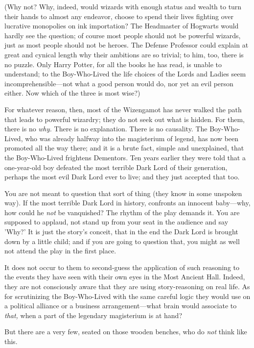 (Why not? Why, indeed, would wizards with enough status and wealth to turn 
their hands to almost any endeavor, choose to spend their lives fighting over 
lucrative monopolies on ink importation? The Headmaster of Hogwarts would 
hardly see the question; of course most people should not be powerful wizards, 
just as most people should not be heroes. The Defense Professor could explain 
at great and cynical length why their ambitions are so trivial; to him, too, 
there is no puzzle. Only Harry Potter, for all the books he has read, is unable 
to understand; to the Boy-Who-Lived the life choices of the Lords and Ladies 
seem incomprehensible---not what a good person would do, nor yet an evil person 
either. Now which of the three is most wise?)

For whatever reason, then, most of the Wizengamot has never walked the path 
that leads to powerful wizardry; they do not seek out what is hidden. For them, 
there is no \emph{why.} There is no explanation. There is no causality. The 
Boy-Who-Lived, who was already halfway into the magisterium of legend, has now 
been promoted all the way there; and it is a brute fact, simple and 
unexplained, that the Boy-Who-Lived frightens Dementors. Ten years earlier they 
were told that a one-year-old boy defeated the most terrible Dark Lord of their 
generation, perhaps the most evil Dark Lord ever to live; and they just 
accepted that too.

You are not meant to question that sort of thing (they know in some unspoken 
way). If the most terrible Dark Lord in history, confronts an innocent 
baby---why, how could he \emph{not} be vanquished? The rhythm of the play 
demands it. You are supposed to applaud, not stand up from your seat in the 
audience and say 'Why?' It is just the story's conceit, that in the end the 
Dark Lord is brought down by a little child; and if you are going to question 
that, you might as well not attend the play in the first place.

It does not occur to them to second-guess the application of such reasoning to 
the events they have seen with their own eyes in the Most Ancient Hall. Indeed, 
they are not consciously aware that they are using story-reasoning on real 
life. As for scrutinizing the Boy-Who-Lived with the same careful logic they 
would use on a political alliance or a business arrangement---what brain would 
associate to \emph{that,} when a part of the legendary magisterium is at hand?

But there are a very few, seated on those wooden benches, who do \emph{not} 
think like this.

